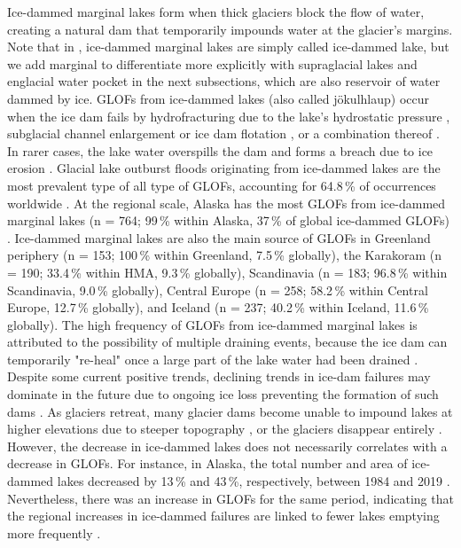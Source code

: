 Ice-dammed marginal lakes form when thick glaciers block the flow of water, creating a natural dam that temporarily impounds water at the glacier's margins. Note that in \cite{Lutzow&al2023,Zhang&al2024}, ice-dammed marginal lakes are simply called ice-dammed lake, but we add marginal to differentiate more explicitly with supraglacial lakes and englacial water pocket in the next subsections, which are also reservoir of water dammed by ice. GLOFs from ice-dammed lakes (also called jökulhlaup) occur when the ice dam fails by hydrofracturing due to the lake's hydrostatic pressure \citep[e.g.][]{Lindner&al2020}, subglacial channel enlargement \citep{Nye1976} or ice dam flotation \citep[e.g.][]{Bjornsson&al1996}, or a combination thereof \citep{Flowers&al2004}. In rarer cases, the lake water overspills the dam and forms a breach due to ice erosion \citep[e.g.][]{Walder&Costa1996,Raymond&Nolan2000,Mayer&Schuler2005}. Glacial lake outburst floods originating from ice-dammed lakes are the most prevalent type of all type of GLOFs, accounting for 64.8\,\% of occurrences worldwide \cite{Lutzow&al2023}. At the regional scale, Alaska has the most GLOFs from ice-dammed marginal lakes (n = 764; 99\,\% within Alaska, 37\,\% of global ice-dammed GLOFs) \citep{Emmer&al2022}. Ice-dammed marginal lakes are also the main source of GLOFs in Greenland periphery (n = 153; 100\,\% within Greenland, 7.5\,\% globally), the Karakoram (n = 190; 33.4\,\% within HMA, 9.3\,\% globally), Scandinavia (n = 183; 96.8\,\% within Scandinavia, 9.0\,\% globally), Central Europe (n = 258; 58.2\,\% within Central Europe, 12.7\,\% globally), and Iceland (n = 237; 40.2\,\% within Iceland, 11.6\,\% globally)\citep{Zhang&al2024}. The high frequency of GLOFs from ice-dammed marginal lakes is attributed to the possibility of multiple draining events, because the ice dam can temporarily "re-heal" once a large part of the lake water had been drained \citep{Zhang&al2024}. Despite some current positive trends, declining trends in ice-dam failures may dominate in the future due to ongoing ice loss preventing the formation of such dams \citep{Rick&al2022}. As glaciers retreat, many glacier dams become unable to impound lakes at higher elevations due to steeper topography \cite{Zhang&al2024}, or the glaciers disappear entirely \citep[e.g.][]{Geertsema&Clague2005,Tweed&Russel1999,Wolf}. However, the decrease in ice-dammed lakes does not necessarily correlates with a decrease in GLOFs. For instance, in Alaska, the total number and area of ice-dammed lakes decreased by 13\,\% and 43\,\%, respectively, between 1984 and 2019 \citep{Veh&al2022}. Nevertheless, there was an increase in GLOFs for the same period, indicating that the regional increases in ice-dammed failures are linked to fewer lakes emptying more frequently \citep{Veh&al2022}.


